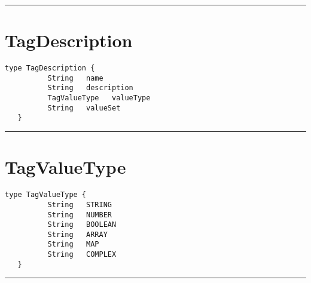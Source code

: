 \rule{12cm}{2pt}
\section{TagDescription}
\label{type:TagDescription}

\begin{lstlisting}[style=nonumbers]
   type TagDescription {
          String   name
          String   description
          TagValueType   valueType
          String   valueSet
   }
\end{lstlisting}

\rule{12cm}{2pt}
\section{TagValueType}
\label{type:TagValueType}

\begin{lstlisting}[style=nonumbers]
   type TagValueType {
          String   STRING
          String   NUMBER
          String   BOOLEAN
          String   ARRAY
          String   MAP
          String   COMPLEX
   }
\end{lstlisting}

\rule{12cm}{2pt}
